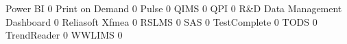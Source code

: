 \documentclass{article}
\begin{document}
\begin{Schunk}
\begin{Soutput}
  Power BI                                                              0
  Print on Demand                                                       0
  Pulse                                                                 0
  QIMS                                                                  0
  QPI                                                                   0
  R&D Data Management Dashboard                                         0
  Reliasoft Xfmea                                                       0
  RSLMS                                                                 0
  SAS                                                                   0
  TestComplete                                                          0
  TODS                                                                  0
  TrendReader                                                           0
  WWLIMS                                                                0
                                                           

\end{Soutput}
\end{Schunk}
\end{document}
